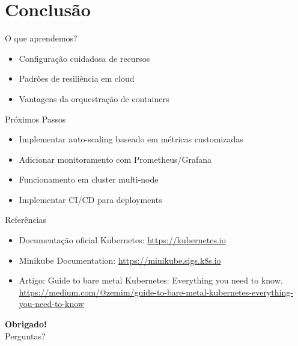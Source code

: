 \documentclass{beamer}
\begin{document}
\section{Conclusão}

\begin{frame}{O que aprendemos?}
    \begin{itemize}
        \item Configuração cuidadosa de recursos
        \item Padrões de resiliência em cloud
        \item Vantagens da orquestração de containers
    \end{itemize}
\end{frame}

\begin{frame}{Próximos Passos}
    \begin{itemize}
        \item Implementar auto-scaling baseado em métricas customizadas
        \item Adicionar monitoramento com Prometheus/Grafana
        \item Funcionamento em cluster multi-node
        \item Implementar CI/CD para deployments
    \end{itemize}
\end{frame}

\begin{frame}{Referências}
    \begin{itemize}
        \item Documentação oficial Kubernetes: \url{https://kubernetes.io}
        \item Minikube Documentation: \url{https://minikube.sigs.k8s.io}
        \item Artigo: Guide to bare metal Kubernetes: Everything you need to know. \\ \url{https://medium.com/@zemim/guide-to-bare-metal-kubernetes-everything-you-need-to-know}
    \end{itemize}
    \centering
    \vspace{1cm}
    \textbf{Obrigado!}\\
    \small Perguntas?
\end{frame}
\end{document}
